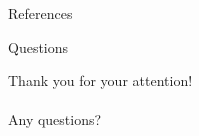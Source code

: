 \documentclass[aspectratio=169]{beamer}
\begin{document}
\begin{frame}[fragile]{References}
	\printbibliography
\end{frame}

\begin{frame}[fragile]{Questions}
	\begin{center}
		Thank you for your attention!\\
		\\
		Any questions?
	\end{center}
\end{frame}
\end{document}
